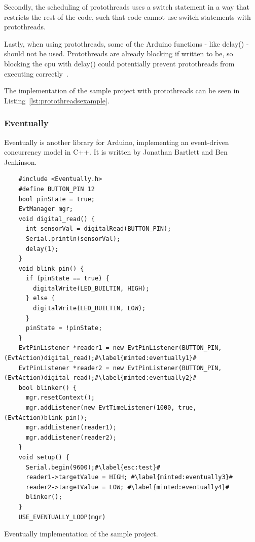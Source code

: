 Secondly, the scheduling of protothreads uses a switch statement in a way that restricts the rest of the code, such that code cannot use switch statements with protothreads.

Lastly, when using protothreads, some of the Arduino functions - like delay() - should not be used. Protothreads are already blocking if written to be, so blocking the cpu with delay() could potentially prevent protothreads from executing correctly~\cite{AdamDunkelProtothreads}.

The implementation of the sample project with protothreads can be seen in Listing~\ref{lst:protothreadsexample}.


\subsubsection{Eventually}
Eventually is another library for Arduino, implementing an event-driven concurrency model in C++. It is written by Jonathan Bartlett and Ben Jenkinson.


\begin{listing}[htb!]
  \begin{verbatim}
    #include <Eventually.h>
    #define BUTTON_PIN 12
    bool pinState = true;
    EvtManager mgr;
    void digital_read() {
      int sensorVal = digitalRead(BUTTON_PIN);
      Serial.println(sensorVal);
      delay(1);
    }
    void blink_pin() {
      if (pinState == true) {
        digitalWrite(LED_BUILTIN, HIGH);
      } else {
        digitalWrite(LED_BUILTIN, LOW);
      }
      pinState = !pinState;
    }
    EvtPinListener *reader1 = new EvtPinListener(BUTTON_PIN, (EvtAction)digital_read);#\label{minted:eventually1}#
    EvtPinListener *reader2 = new EvtPinListener(BUTTON_PIN, (EvtAction)digital_read);#\label{minted:eventually2}#
    bool blinker() {
      mgr.resetContext();
      mgr.addListener(new EvtTimeListener(1000, true, (EvtAction)blink_pin));
      mgr.addListener(reader1);
      mgr.addListener(reader2);
    }
    void setup() {
      Serial.begin(9600);#\label{esc:test}#
      reader1->targetValue = HIGH; #\label{minted:eventually3}#
      reader2->targetValue = LOW; #\label{minted:eventually4}#
      blinker();
    }
    USE_EVENTUALLY_LOOP(mgr)
  \end{verbatim}
  \caption{Eventually implementation of the sample project.}
  \label{lst:eventuallyexample}
\end{listing}


